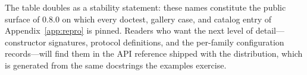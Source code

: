 The table doubles as a stability statement: these names constitute the
public surface of \pqlang{} 0.8.0 on which every doctest, gallery case,
and catalog entry of Appendix~\ref{app:repro} is pinned.  Readers who want
the next level of detail---constructor signatures, protocol definitions,
and the per-family configuration records---will find them in the API
reference shipped with the distribution, which is generated from the same
docstrings the examples exercise.
